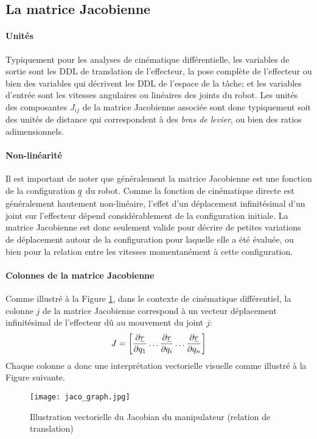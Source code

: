 \subsection{La matrice Jacobienne}

\paragraph{Unités} Typiquement pour les analyses de cinématique différentielle, les variables de sortie sont les DDL de translation de l'effecteur, la pose complète de l'effecteur ou bien des variables qui décrivent les DDL de l'espace de la tâche; et les variables d'entrée sont les vitesses angulaires ou linéaires des joints du robot. Les unités des composantes $J_{ij}$ de la matrice Jacobienne associée sont donc typiquement soit des unités de distance qui correspondent à des \textit{bras de levier}, ou bien des ratios adimensionnels.

\paragraph{Non-linéarité} Il est important de noter que généralement la matrice Jacobienne est une fonction de la configuration $\underline{q}$ du robot. Comme la fonction de cinématique directe est généralement hautement non-linéaire, l'effet d'un déplacement infinitésimal d'un joint sur l'effecteur dépend considérablement de la configuration initiale. La matrice Jacobienne est donc seulement valide pour décrire de petites variations de déplacement autour de la configuration pour laquelle elle a été évaluée, ou bien pour la relation entre les vitesses momentanément à cette configuration.

\paragraph{Colonnes de la matrice Jacobienne} Comme illustré à la Figure \ref{fig:jaco_graph}, dans le contexte de cinématique différentiel, la colonne $j$ de la matrice Jacobienne correspond à un vecteur déplacement infinitésimal de l'effecteur dû au mouvement du joint $j$:
\begin{equation}
	J = \left[ \frac{\partial \underline{r}}{\partial q_1}   \hdots \frac{\partial \underline{r}}{\partial q_i} \hdots \frac{\partial \underline{r}}{\partial q_n}  \right]
\end{equation}
Chaque colonne a donc une interprétation vectorielle visuelle comme illustré à la Figure suivante.
\begin{figure}[H]
	\vspace{-5pt}
	\centering
	\texttt{[image: jaco\_graph.jpg]}
	\caption{Illustration vectorielle du Jacobian du manipulateur (relation de translation)}
	\vspace{-5pt}
	\label{fig:jaco_graph}
\end{figure}



